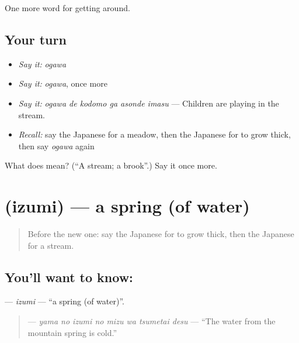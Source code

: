\begin{grammarlens}[title={What you've built}]
One more word for getting around.
\end{grammarlens}

\subsection*{Your turn}
\begin{itemize}
\raggedright
  \item \emph{Say it:} \emph{ogawa}
  \item \emph{Say it:} \emph{ogawa}, once more
  \item \emph{Say it:} \emph{ogawa de kodomo ga asonde imasu} — Children are playing in the stream.
  \item \emph{Recall:} say the Japanese for a meadow, then the Japanese for to grow thick, then say \emph{ogawa} again
\end{itemize}

\begin{tcolorbox}[breakable,colback=teal!4,colframe=teal!35!black,title={Before you move on}]
What does  mean? (\textquotedblleft{}A stream; a brook\textquotedblright{}.) Say it once more.
\end{tcolorbox}
\section[\texorpdfstring{\ja{いずみ} (izumi)}{いずみ (izumi)}]{ (izumi) — a spring (of water)}

\label{lesson:JA-C411-izumi}



\begin{quote}
Before the new one: say the Japanese for to grow thick, then the Japanese for a stream.
\end{quote}

\subsection*{You'll want to know: }
\textbf{} — \emph{izumi} — \textquotedblleft{}a spring (of water)\textquotedblright{}.

\begin{quote}
\textbf{   } — \emph{yama no izumi no mizu wa tsumetai desu} — \textquotedblleft{}The water from the mountain spring is cold.\textquotedblright{}
\end{quote}

